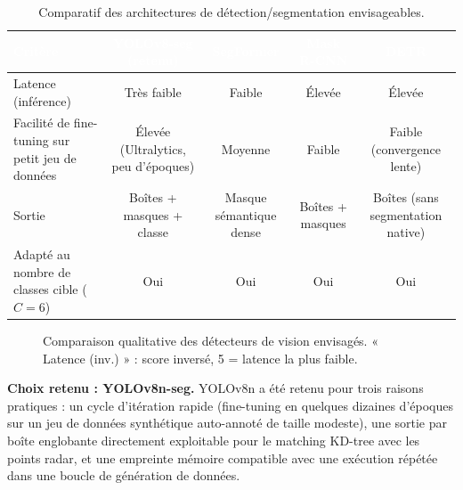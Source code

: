 \documentclass[12pt,a4paper,titlepage]{article}
\newcommand{\hd}[1]{\textcolor{white}{\textbf{#1}}}
\begin{document}
\begin{table}[H]
    \centering
    \caption{Comparatif des architectures de détection/segmentation envisageables.}
    \begin{tabularx}{\textwidth}{F{3.2cm}CCCC}
        \toprule
        \hd{Critère} & \hd{YOLOv8-seg (retenu)} & \hd{SegFormer} & \hd{Mask R-CNN} & \hd{DETR} \\
        \midrule
        Latence (inférence) & Très faible & Faible & Élevée & Élevée \\
        Facilité de fine-tuning sur petit jeu de données & Élevée (Ultralytics, peu d'époques) & Moyenne & Faible & Faible (convergence lente) \\
        Sortie & Boîtes + masques + classe & Masque sémantique dense & Boîtes + masques & Boîtes (sans segmentation native) \\
        Adapté au nombre de classes cible ($C=6$) & Oui & Oui & Oui & Oui \\
        \bottomrule
    \end{tabularx}
\end{table}

\begin{figure}[H]
    \centering
    \caption{Comparaison qualitative des détecteurs de vision envisagés. « Latence (inv.) » : score inversé, 5 = latence la plus faible.}
    \label{fig:chart_detecteur}
\end{figure}

\textbf{Choix retenu : YOLOv8n-seg.} YOLOv8n a été retenu pour trois raisons pratiques : un cycle d'itération rapide (fine-tuning en quelques dizaines d'époques sur un jeu de données synthétique auto-annoté de taille modeste), une sortie par boîte englobante directement exploitable pour le matching KD-tree avec les points radar, et une empreinte mémoire compatible avec une exécution répétée dans une boucle de génération de données.
\end{document}
